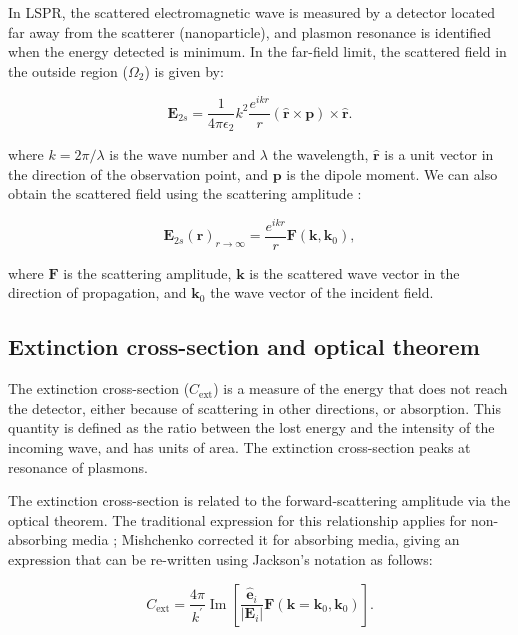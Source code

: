 In LSPR, the scattered electromagnetic wave is measured by a detector located far away 
from the scatterer (nanoparticle), and plasmon resonance is identified when the energy 
detected is minimum. In the far-field limit, the scattered field
in the outside region ($\Omega_2$) is given by: 

\begin{equation} \label{eq:scat_efield_long_range}
    \mathbf{E}_{2s} = \frac{1}{4\pi\epsilon_2}k^2\frac{e^{ikr}}{r} (\mathbf{\hat{r}} \times \mathbf{p})\times\mathbf{\hat{r}}.
\end{equation} 

\noindent where $k=2\pi/\lambda$ is the wave number and $\lambda$ the wavelength, $\mathbf{\hat{r}}$ 
is a unit vector in the direction of the observation point, and $\mathbf{p}$ is
the dipole moment.
We can also obtain the scattered field using the 
scattering amplitude \cite{Jackson}:

\begin{equation} \label{eq:scat_efield_fwa}
    \mathbf{E}_{2s}(\mathbf{r})_{r\to\infty} = \frac{e^{ikr}}{r} \mathbf{F}(\mathbf{k},\mathbf{k}_0),
\end{equation}

\noindent where $\mathbf{F}$ is the scattering amplitude, $\mathbf{k}$ is the 
scattered wave vector in the direction of propagation, and $\mathbf{k}_0$ the 
wave vector of the incident field. 

\subsection{Extinction cross-section and optical theorem} \label{sec:cext_ot}

The extinction cross-section ($C_\text{ext}$) is a measure of the energy that 
does not reach the detector, either because of scattering in other directions,
or absorption. This quantity is defined as the ratio between the lost energy and 
the intensity of the incoming wave, and has units of area. 
The extinction cross-section peaks at resonance of plasmons.

The extinction cross-section is related to the forward-scattering amplitude via the optical theorem. 
The traditional expression for this relationship applies for non-absorbing media 
\cite{MayergoyzZhang2007, Jackson}; 
Mishchenko \cite{Mishchenko2007} corrected it for absorbing media, 
giving an expression that can be re-written using Jackson's notation \cite{Jackson} as follows:

\begin{equation} \label{eq:cext_fwa}
    C_\text{ext} = \frac{4\pi}{k^\prime} \operatorname{Im} \left[ \frac{\mathbf{\hat{e}}_i}{|\mathbf{E}_i|}\mathbf{F}(\mathbf{k}=\mathbf{k}_0, \mathbf{k}_0) \right].
\end{equation}

